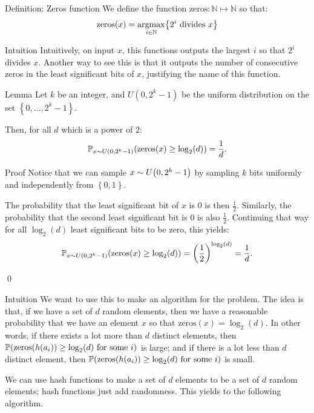 \documentclass[a4paper]{article}
\begin{document}
\begin{parag}{Definition: Zeros function}
    We define the function $\text{zeros}: \mathbb{N} \mapsto \mathbb{N}$ so that: 
    \[\text{zeros}\left(x\right) = \argmax_{i \in \mathbb{N}}\left\{2^i \text{ divides } x\right\}\]
    
    \begin{subparag}{Intuition}
        Intuitively, on input $x$, this functions outputs the largest $i$ so that $2^i$ divides $x$. Another way to see this is that it outputs the number of consecutive zeros in the least significant bits of $x$, justifying the name of this function.
    \end{subparag}
\end{parag}

\begin{parag}{Lemma}
    Let $k$ be an integer, and $U\left(0, 2^k-1\right)$ be the uniform distribution on the set $\left\{0, \ldots, 2^k-1\right\}$.

    Then, for all $d$ which is a power of $2$: 
    \[\prob_{x \followsdistr U\left(0, 2^k - 1\right)}\left(\text{zeros}\left(x\right) \geq \log_2\left(d\right)\right) = \frac{1}{d}.\]

    \begin{subparag}{Proof}
        Notice that we can sample $x \followsdistr U\left(0, 2^k - 1\right)$ by sampling $k$ bits uniformly and independently from $\left\{0, 1\right\}$.

        The probability that the least significant bit of $x$ is $0$ is then $\frac{1}{2}$. Similarly, the probability that the second least significant bit is $0$ is also $\frac{1}{2}$. Continuing that way for all $\log_2\left(d\right)$ least significant bits to be zero, this yields: 
        \[\prob_{x \followsdistr U\left(0, 2^k - 1\right)}\left(\text{zeros}\left(x\right) \geq \log_2\left(d\right)\right) = \left(\frac{1}{2}\right)^{\log_2\left(d\right)} = \frac{1}{d}.\]

        \qed
    \end{subparag}

    \begin{subparag}{Intuition}
        We want to use this to make an algorithm for the  problem. The idea is that, if we have a set of $d$ random elements, then we have a reasonable probability that we have an element $x$ so that $\text{zeros}\left(x\right) = \log_2\left(d\right)$. In other words, if there exists a lot more than $d$ distinct elements, then $\prob\left(\text{zeros}\left(h\left(a_i\right)\right) \geq \log_2\left(d\right) \text{ for some $i$}\right)$ is large; and if there is a lot less than $d$ distinct element, then $\prob\left(\text{zeros}\left(h\left(a_i\right)\right) \geq \log_2\left(d\right) \text{ for some $i$}\right)$ is small.

        We can use hash functions to make a set of $d$ elements to be a set of $d$ random elements; hash functions just add randomness. This yields to the following algorithm.
    \end{subparag}
\end{parag}
\end{document}
